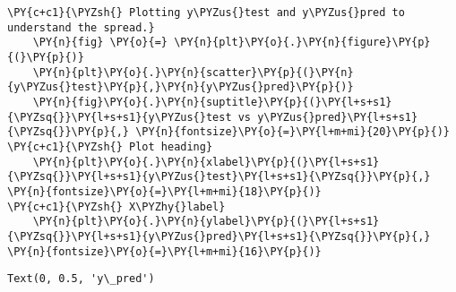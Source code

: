         \begin{tcolorbox}[breakable, size=fbox, boxrule=1pt, pad at break*=1mm,colback=cellbackground, colframe=cellborder]
    \begin{Verbatim}[commandchars=\\\{\}]
    \PY{c+c1}{\PYZsh{} Plotting y\PYZus{}test and y\PYZus{}pred to understand the spread.}
    \PY{n}{fig} \PY{o}{=} \PY{n}{plt}\PY{o}{.}\PY{n}{figure}\PY{p}{(}\PY{p}{)}
    \PY{n}{plt}\PY{o}{.}\PY{n}{scatter}\PY{p}{(}\PY{n}{y\PYZus{}test}\PY{p}{,}\PY{n}{y\PYZus{}pred}\PY{p}{)}
    \PY{n}{fig}\PY{o}{.}\PY{n}{suptitle}\PY{p}{(}\PY{l+s+s1}{\PYZsq{}}\PY{l+s+s1}{y\PYZus{}test vs y\PYZus{}pred}\PY{l+s+s1}{\PYZsq{}}\PY{p}{,} \PY{n}{fontsize}\PY{o}{=}\PY{l+m+mi}{20}\PY{p}{)}              \PY{c+c1}{\PYZsh{} Plot heading}
    \PY{n}{plt}\PY{o}{.}\PY{n}{xlabel}\PY{p}{(}\PY{l+s+s1}{\PYZsq{}}\PY{l+s+s1}{y\PYZus{}test}\PY{l+s+s1}{\PYZsq{}}\PY{p}{,} \PY{n}{fontsize}\PY{o}{=}\PY{l+m+mi}{18}\PY{p}{)}                          \PY{c+c1}{\PYZsh{} X\PYZhy{}label}
    \PY{n}{plt}\PY{o}{.}\PY{n}{ylabel}\PY{p}{(}\PY{l+s+s1}{\PYZsq{}}\PY{l+s+s1}{y\PYZus{}pred}\PY{l+s+s1}{\PYZsq{}}\PY{p}{,} \PY{n}{fontsize}\PY{o}{=}\PY{l+m+mi}{16}\PY{p}{)}
    \end{Verbatim}
    \end{tcolorbox}
    
                \begin{tcolorbox}[breakable, size=fbox, boxrule=.5pt, pad at break*=1mm, opacityfill=0]
    \begin{Verbatim}[commandchars=\\\{\}]
    Text(0, 0.5, 'y\_pred')
    \end{Verbatim}
    \end{tcolorbox}
            
        \begin{center}
        \end{center}
        { \hspace*{\fill} \\}
        
